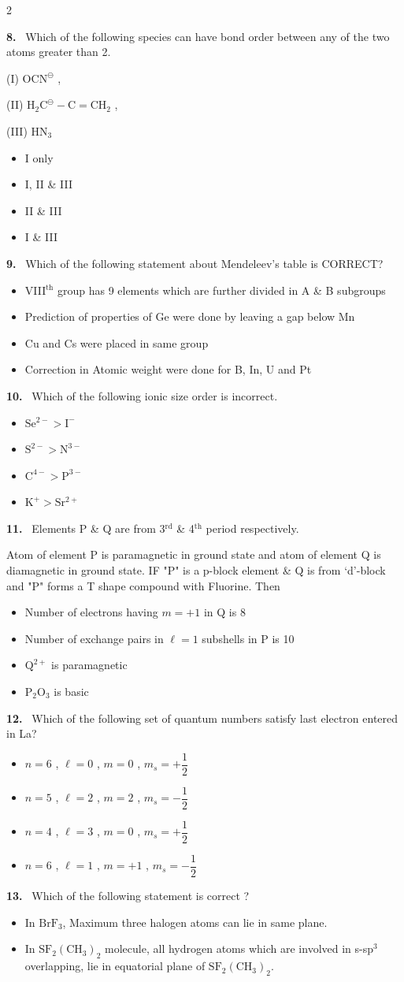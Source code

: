 \documentclass[10pt]{extarticle}
\newcommand{\qn}[1]{\par\smallskip\noindent\textbf{#1.}~}
\newenvironment{qoptions}{\begin{itemize}[leftmargin=1.8em,itemsep=1pt,topsep=2pt,label={}]}{\end{itemize}}
\newcommand{\opt}[2]{\item[(#1)] #2}
\begin{document}
\begin{multicols}{2}
\qn{8} Which of the following species can have bond order between any of the two atoms greater than 2.\par
(I) $\mathrm{OCN^{\ominus}}$ ,\par
(II) $\mathrm{H_2C^{\ominus}-C=CH_2}$ ,\par
(III) $\mathrm{HN_3}$
\begin{qoptions}
\opt{A}{I only}
\opt{B}{I, II \& III}
\opt{C}{II \& III}
\opt{D}{I \& III}
\end{qoptions}
\qn{9} Which of the following statement about Mendeleev's table is CORRECT?
\begin{qoptions}
\opt{A}{VIII$^{\mathrm{th}}$ group has 9 elements which are further divided in A \& B subgroups}
\opt{B}{Prediction of properties of Ge were done by leaving a gap below Mn}
\opt{C}{Cu and Cs were placed in same group}
\opt{D}{Correction in Atomic weight were done for B, In, U and Pt}
\end{qoptions}
\qn{10} Which of the following ionic size order is incorrect.
\begin{qoptions}
\opt{A}{$\mathrm{Se^{2-}>I^-}$}
\opt{B}{$\mathrm{S^{2-}>N^{3-}}$}
\opt{C}{$\mathrm{C^{4-}>P^{3-}}$}
\opt{D}{$\mathrm{K^+>Sr^{2+}}$}
\end{qoptions}
\qn{11} Elements P \& Q are from 3$^{\mathrm{rd}}$ \& 4$^{\mathrm{th}}$ period respectively.\par
Atom of element P is paramagnetic in ground state and atom of element Q is diamagnetic in ground state. IF "P" is a p-block element \& Q is from `d'-block and "P" forms a T shape compound with Fluorine. Then
\begin{qoptions}
\opt{A}{Number of electrons having $m=+1$ in Q is 8}
\opt{B}{Number of exchange pairs in $\ell=1$ subshells in P is 10}
\opt{C}{$\mathrm{Q^{2+}}$ is paramagnetic}
\opt{D}{$\mathrm{P_2O_3}$ is basic}
\end{qoptions}
\qn{12} Which of the following set of quantum numbers satisfy last electron entered in La?
\begin{qoptions}
\opt{A}{$n=6$ , $\ell=0$ , $m=0$ , $m_s=+\dfrac12$}
\opt{B}{$n=5$ , $\ell=2$ , $m=2$ , $m_s=-\dfrac12$}
\opt{C}{$n=4$ , $\ell=3$ , $m=0$ , $m_s=+\dfrac12$}
\opt{D}{$n=6$ , $\ell=1$ , $m=+1$ , $m_s=-\dfrac12$}
\end{qoptions}
\qn{13} Which of the following statement is correct ?
\begin{qoptions}
\opt{A}{In $\mathrm{BrF_3}$, Maximum three halogen atoms can lie in same plane.}
\opt{B}{In $\mathrm{SF_2(CH_3)_2}$ molecule, all hydrogen atoms which are involved in s-sp$^3$ overlapping, lie in equatorial plane of $\mathrm{SF_2(CH_3)_2}$.}

\end{qoptions}
\end{multicols}
\end{document}
